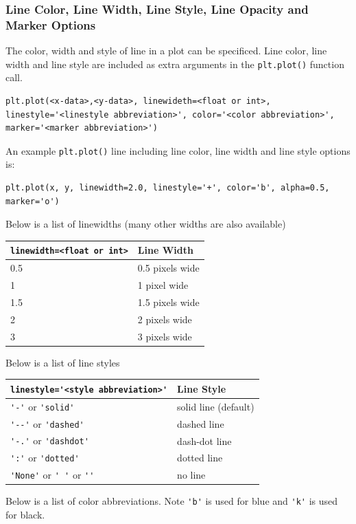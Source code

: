 \documentclass{book}
\begin{document}
    
        \subsubsection{Line Color, Line Width, Line Style, Line Opacity and
Marker
Options}\label{line-color-line-width-line-style-line-opacity-and-marker-options}

The color, width and style of line in a plot can be specificed. Line
color, line width and line style are included as extra arguments in the
\lstinline!plt.plot()! function call.

\begin{lstlisting}
plt.plot(<x-data>,<y-data>, linewideth=<float or int>, linestyle='<linestyle abbreviation>', color='<color abbreviation>', marker='<marker abbreviation>')
\end{lstlisting}

An example \lstinline!plt.plot()! line including line color, line width
and line style options is:

\begin{lstlisting}
plt.plot(x, y, linewidth=2.0, linestyle='+', color='b', alpha=0.5, marker='o')
\end{lstlisting}

Below is a list of linewidths (many other widths are also available)

\begin{longtable}[]{@{}ll@{}}
\toprule
\lstinline!linewidth=<float or int>! & Line Width\tabularnewline
\midrule
\endhead
0.5 & 0.5 pixels wide\tabularnewline
1 & 1 pixel wide\tabularnewline
1.5 & 1.5 pixels wide\tabularnewline
2 & 2 pixels wide\tabularnewline
3 & 3 pixels wide\tabularnewline
\bottomrule
\end{longtable}

Below is a list of line styles

\begin{longtable}[]{@{}ll@{}}
\toprule
\lstinline!linestyle='<style abbreviation>'! & Line Style\tabularnewline
\midrule
\endhead
\lstinline!'-'! or \lstinline!'solid'! & solid line
(default)\tabularnewline
\lstinline!'--'! or \lstinline!'dashed'! & dashed line\tabularnewline
\lstinline!'-.'! or \lstinline!'dashdot'! & dash-dot line\tabularnewline
\lstinline!':'! or \lstinline!'dotted'! & dotted line\tabularnewline
\lstinline!'None'! or \lstinline!' '! or \lstinline!''! & no
line\tabularnewline
\bottomrule
\end{longtable}

Below is a list of color abbreviations. Note \lstinline!'b'! is used for
blue and \lstinline!'k'! is used for black.
\end{document}
